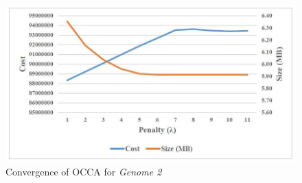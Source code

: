 \documentclass[twocolumn,12pt,a4paper]{article}
\begin{document}
\begin{figure}[h]
\begin{center}
\includegraphics[scale=0.26]{Images/drawing4_1.jpg}
\caption{Convergence of OCCA for \textit{Genome 2}}
\end{center}
\label{Fig5}
\end{figure}
\end{document}
